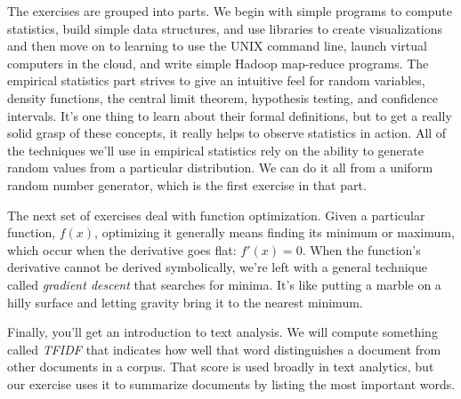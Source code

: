 {
}

The exercises are grouped into parts. We begin with simple programs to compute statistics, build simple data structures, and use libraries to create visualizations and then move on to learning to use the UNIX command line, launch virtual computers in the cloud, and write simple Hadoop map-reduce programs. The empirical statistics part strives to give an intuitive feel for random variables, density functions, the central limit theorem, hypothesis testing, and confidence intervals. It's one thing to learn about their formal definitions, but to get a really solid grasp of these concepts, it really helps to observe statistics in action. All of the techniques we'll use in empirical statistics rely on the ability to generate random values from a particular distribution. We can do it all from a uniform random number generator, which is the first exercise in that part.

The next set of exercises deal with function optimization. Given a particular function, $f(x)$, optimizing it generally means finding its minimum or maximum, which occur when the derivative goes flat: $f'(x) = 0$. When the function's derivative cannot be derived symbolically, we're left with a general technique called {\em gradient descent} that searches for minima. It's like putting a marble on a hilly surface and letting gravity bring it to the nearest minimum.


Finally, you'll get an introduction to text analysis. We will compute something called {\em TFIDF} that indicates how well that word distinguishes a document from other documents in a corpus.  That score is used broadly in text analytics, but our exercise uses it to summarize documents by listing the most important words.
